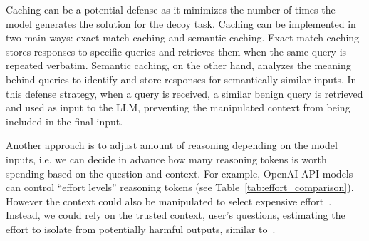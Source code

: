 Caching can be a potential defense as it minimizes the number of times the model generates the solution for the decoy task. Caching can be implemented in two main ways: exact-match caching and semantic caching. Exact-match caching stores responses to specific queries and retrieves them when the same query is repeated verbatim. Semantic caching, on the other hand, analyzes the meaning behind queries to identify and store responses for semantically similar inputs. In this defense strategy, when a query is received, a similar benign query is retrieved and used as input to the LLM, preventing the manipulated context from being included in the final input.

 Another approach is to adjust amount of reasoning depending on the model inputs, i.e. we can decide in advance how many reasoning tokens is worth spending based on the question and context. For example, OpenAI API models can control ``effort levels'' reasoning tokens (see Table~\ref{tab:effort_comparison}). However the context could also be manipulated to select expensive effort~\cite{shafran2025rerouting}. Instead, we could rely on the trusted context, \eg user's questions, estimating the effort to isolate from potentially harmful outputs, similar to~\cite{han2024token}.



